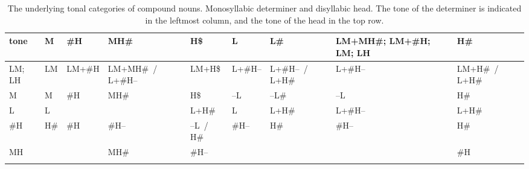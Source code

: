 \begin{subtables}
\begin{table}%
\caption{\label{tab:abstractdisyllabicmonosyllables}The underlying tonal categories of compound nouns. Monosyllabic determiner and disyllabic head. The tone of the determiner is indicated in the leftmost column, and the tone of the head in the top row.}
{\renewcommand{\arraystretch}{1.35}
{\fontsize{9}{10.75}\selectfont
\begin{tabularx}{\textwidth}{ l P{7mm} P{12mm} Q l P{10mm} P{22mm} P{16mm} P{26mm} }
\lsptoprule
	tone & M & \#H & MH\# & H\$ & L & L\# & LM+MH\#; LM+\#H; LM; LH & H\#\\\midrule
	LM; LH & LM & LM+\#H  & LM+MH\#~/ L+\#H-- & LM+H\$ & L+\#H-- & L+\#H--~/ L+H\# & L+\#H-- & LM+H\#~/ L+H\#\\
	M & M & \#H & MH\# & H\$ & --L & --L\# & --L & H\#\\
	L & L &  & \hspace*{\fill} & L+H\# & L & L+H\# & L+\#H-- & L+H\#\\
	\#H & H\# & \#H & \#H-- & --L~/ H\# & \#H-- & H\# & \#H-- & H\#\\
	MH & \hspace*{\fill} & \hspace*{\fill} &
   MH\# & \#H-- & \hspace*{\fill} & \hspace*{\fill} & \hspace*{\fill} & \#H\\
\lspbottomrule
\end{tabularx}}
}
\end{table}


\end{subtables}
